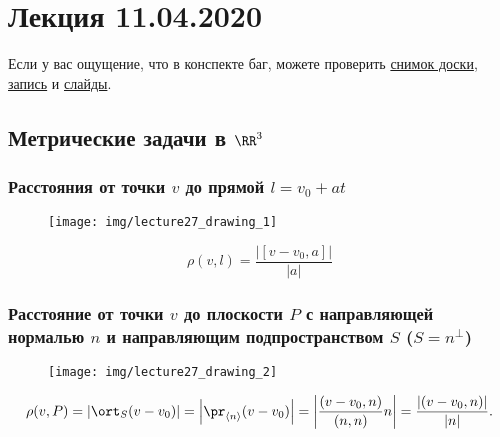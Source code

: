 \section{Лекция 11.04.2020} 

Если у вас ощущение, что в конспекте баг, можете проверить \href{https://www.dropbox.com/s/xsc0pnkmmre2yhe/LA_19-20_osn_Lecture27.svg?dl=0}{снимок доски}, \href{https://youtube.com/watch?v=6WN92vn1HMQ&list=PLEwK9wdS5g0oP4vhnGvQHPSqshML3Ze4P&index=4&t=0s}{запись} и \href{https://www.dropbox.com/s/wnao00nkxnvb9h3/LO_basics.pdf?dl=0}{слайды}.

\subsection{Метрические задачи в $\RR^3$}

\subsubsection{Расстояния от точки $v$ до прямой $l = v_0 + at$}

{
\begin{wrapfigure}[1]{r}{4cm}
    \vspace{-40pt}
    \texttt{[image: img/lecture27\_drawing\_1]}
\end{wrapfigure}

\begin{equation*}
    \displaystyle
    \rho(v, l) = \frac{\left|[v - v_0, a]\right|}{|a|}
\end{equation*}
}


\subsubsection{Расстояние от точки $v$ до плоскости $P$ с направляющей нормалью $n$ и направляющим подпространством $S$ ($S = n^{\perp}$)}

{
\begin{wrapfigure}{r}{4cm}
    \vspace{-20pt}
    \texttt{[image: img/lecture27\_drawing\_2]}
\end{wrapfigure}

\begin{equation*}
    \displaystyle
    \rho(v, P) = \left|\ort_S (v - v_0)\right| = \left|\pr_{\left< n \right>} (v - v_0)\right| = \left|\frac{(v - v_0, n)}{(n, n)} n\right| = \frac{|(v - v_0, n)|}{|n|}.
\end{equation*}
\vspace{1cm}
}


